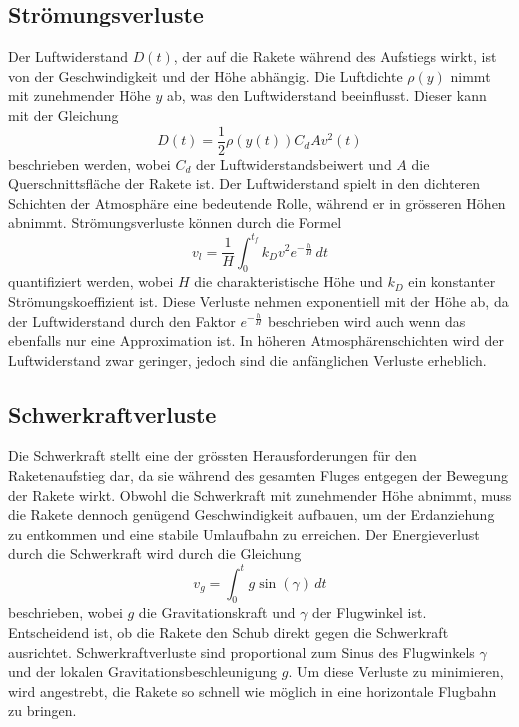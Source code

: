\subsection{Strömungsverluste}
Der Luftwiderstand \(D(t)\), der auf die Rakete während des Aufstiegs wirkt, ist von der Geschwindigkeit und der Höhe abhängig. 
Die Luftdichte \(\rho(y)\) nimmt mit zunehmender Höhe \(y\) ab, was den Luftwiderstand beeinflusst. 
%
Dieser kann mit der Gleichung
\[
D(t) = \frac{1}{2} \rho(y(t)) C_d A v^2(t)
\]
beschrieben werden,
wobei \(C_d\) der Luftwiderstandsbeiwert und \(A\) die Querschnittsfläche der Rakete ist. 
%
Der Luftwiderstand spielt in den dichteren Schichten der Atmosphäre eine bedeutende Rolle, während er in grösseren Höhen abnimmt.
Strömungsverluste können durch die Formel
\[
v_l = \frac{1}{H} \int_0^{t_f} k_D v^2 e^{-\frac{h}{H}} \, dt
\]
quantifiziert werden, wobei \(H\) die charakteristische Höhe und \(k_D\) ein konstanter Strömungskoeffizient ist. 
%
Diese Verluste nehmen exponentiell mit der Höhe ab, da der Luftwiderstand durch den Faktor \(e^{-\frac{h}{H}}\) beschrieben wird auch wenn das ebenfalls nur eine Approximation ist. 
In höheren Atmosphärenschichten wird der Luftwiderstand zwar geringer, jedoch sind die anfänglichen Verluste erheblich.

\subsection{Schwerkraftverluste}
Die Schwerkraft stellt eine der grössten Herausforderungen für den Raketenaufstieg dar, da sie während des gesamten Fluges entgegen der Bewegung der Rakete wirkt. 
Obwohl die Schwerkraft mit zunehmender Höhe abnimmt, muss die Rakete dennoch genügend Geschwindigkeit aufbauen, um der Erdanziehung zu entkommen und eine stabile Umlaufbahn zu erreichen. 
Der Energieverlust durch die Schwerkraft wird durch die Gleichung
\[
v_g = \int_0^t g \sin(\gamma) \, dt
\]
beschrieben, wobei \(g\) die Gravitationskraft und \(\gamma\) der Flugwinkel ist. 
Entscheidend ist, ob die Rakete den Schub direkt gegen die Schwerkraft ausrichtet.
Schwerkraftverluste sind proportional zum Sinus des Flugwinkels \(\gamma\) und der lokalen Gravitationsbeschleunigung \(g\). 
%
Um diese Verluste zu minimieren, wird angestrebt, die Rakete so schnell wie möglich in eine horizontale Flugbahn zu bringen.


